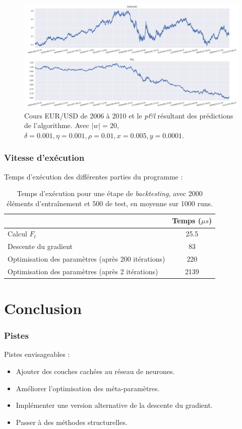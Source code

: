 \documentclass{beamer}
\begin{document}
	\begin{frame}
		\begin{figure}
			\includegraphics[scale=0.275]{../Rapport/res/eursud_2006-2010}
			\caption[Blup]{Cours EUR/USD de 2006 à 2010 et le \textit{p\&l} résultant des prédictions de l'algorithme. Avec $|w| = 20$, $\delta = 0.001, \eta=0.001,\rho=0.01, x = 0.005, y=0.0001$.}
		\end{figure}
	\end{frame}

	\begin{frame}
		\frametitle{Vitesse d'exécution}
		Temps d'exécution des différentes parties du programme :
		\begin{table}
			\centering
			\begin{tabular}{|l|c|}
				\hline
				 & Temps ($\mu s$)\\
				\hline
				Calcul $F_t$ & 25.5\\
				\hline
				Descente du gradient & 83\\
				\hline
				Optimisation des paramètres (après 200 itérations) & 220 \\
				\hline
				Optimisation des paramètres (après 2 itérations) & 2139 \\
				\hline
			\end{tabular}
		\caption{Temps d'exécution pour une étape de \textit{backtesting}, avec 2000 éléments d'entraînement et 500 de test, en moyenne sur 1000 runs.}
		\end{table}
	\end{frame}

	\section{Conclusion}
	
	\begin{frame}
		\frametitle{Pistes}
		Pistes envisageables :
		\begin{itemize}
			\item Ajouter des couches cachées au réseau de neurones.
			\item Améliorer l'optimisation des méta-paramètres.
			\item Implémenter une version alternative de la descente du gradient.
			\item Passer à des méthodes structurelles.
		\end{itemize}
	\end{frame}
\end{document}
